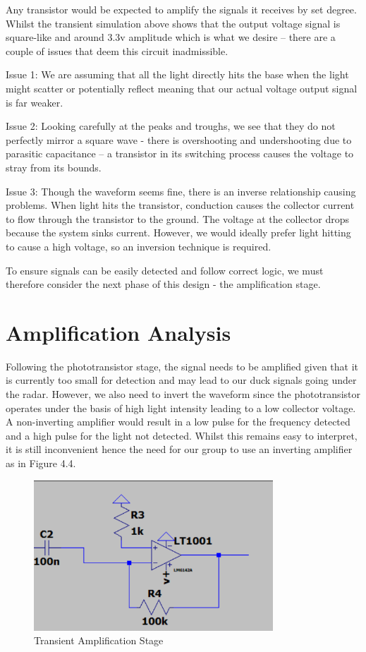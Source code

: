 Any transistor would be expected to amplify the signals it receives by set degree. Whilst the transient simulation above shows that the output voltage signal is square-like and around 3.3v amplitude which is what we desire – there are a couple of issues that deem this circuit inadmissible.

Issue 1: We are assuming that all the light directly hits the base when the light might scatter or potentially reflect meaning that our actual voltage output signal is far weaker.

Issue 2: Looking carefully at the peaks and troughs, we see that they do not perfectly mirror a square wave - there is overshooting and undershooting due to parasitic capacitance – a transistor in its switching process causes the voltage to stray from its bounds.

Issue 3: Though the waveform seems fine, there is an inverse relationship causing problems. When light hits the transistor, conduction causes the collector current to flow through the transistor to the ground. The voltage at the collector drops because the system sinks current. However, we would ideally prefer light hitting to cause a high voltage, so an inversion technique is required.

To ensure signals can be easily detected and follow correct logic, we must therefore consider the next phase of this design - the amplification stage.

\section{Amplification Analysis}
Following the phototransistor stage, the signal needs to be amplified given that it is currently too small for detection and may lead to our duck signals going under the radar. However, we also need to invert the waveform since the phototransistor operates under the basis of high light intensity leading to a low collector voltage. A non-inverting amplifier would result in a low pulse for the frequency detected and a high pulse for the light not detected. Whilst this remains easy to interpret, it is still inconvenient hence the need for our group to use an inverting amplifier as in Figure 4.4.

\begin{figure}[h]
    \centering
    \includegraphics[width=0.8\textwidth]{subpages/images/amplification_stage.png}
    \caption{Transient Amplification Stage}
    \label{fig:amp_stage}
\end{figure}

